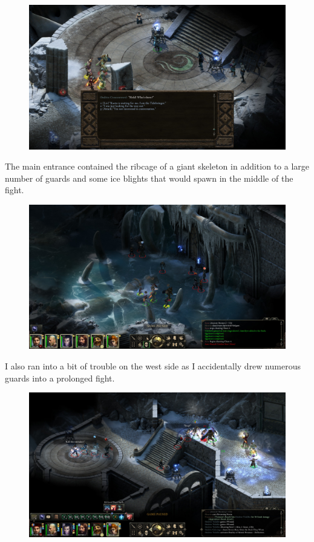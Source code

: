 \documentclass{article}
\begin{document}
\begin{figure}
\includegraphics[scale=0.33]{files/blog/2020_01_18_poe_potd_wmpt2/2020_01_18_abbey01.jpg}
\end{figure}

The main entrance contained the ribcage of a giant skeleton in addition to a large number of guards and some ice blights that would spawn in the middle of the fight.

\begin{figure}
\includegraphics[scale=0.33]{files/blog/2020_01_18_poe_potd_wmpt2/2020_01_18_abbey02.jpg}
\end{figure}

I also ran into a bit of trouble on the west side as I accidentally drew numerous guards into a prolonged fight.

\begin{figure}
\includegraphics[scale=0.33]{files/blog/2020_01_18_poe_potd_wmpt2/2020_01_18_abbey03.jpg}
\end{figure}
\end{document}
